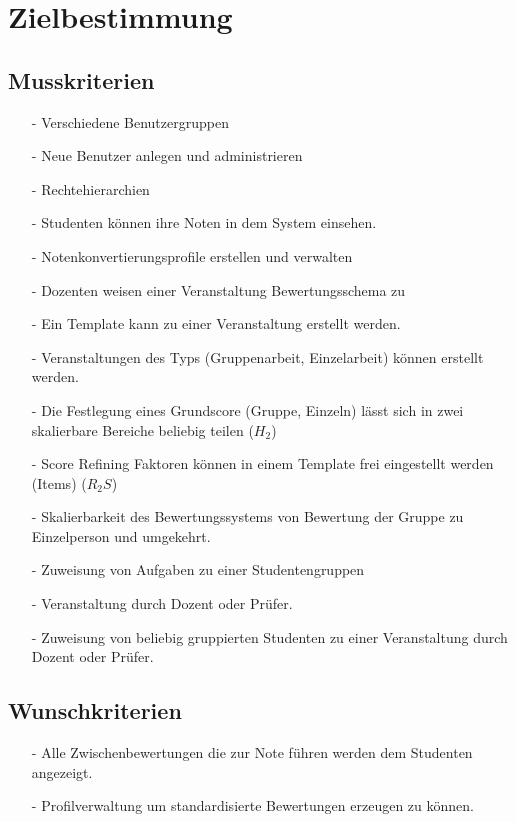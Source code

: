 


	
	\tableofcontents
	\newpage

	\section{Zielbestimmung}
		\subsection{Musskriterien}			

			
			\begin{itemize}
			\item[-]	Verschiedene Benutzergruppen
			\item[-]	Neue Benutzer anlegen und administrieren 
			\item[-]	Rechtehierarchien
			\item[-]	Studenten können ihre Noten in dem System einsehen.
			\item[-]	Notenkonvertierungsprofile erstellen und verwalten
			\item[-]	Dozenten weisen einer Veranstaltung Bewertungsschema zu
			\item[-]	Ein Template kann zu einer Veranstaltung erstellt werden.
			\item[-]	Veranstaltungen des Typs (Gruppenarbeit, Einzelarbeit) können erstellt werden.
			\item[-]	Die Festlegung eines Grundscore (Gruppe, Einzeln) lässt sich in zwei skalierbare \newline Bereiche beliebig teilen ($H_2$)
			\item[-]	Score Refining Faktoren können in einem Template frei eingestellt werden (Items) ($R_2S$)
			\item[-]	Skalierbarkeit des Bewertungssystems von Bewertung der Gruppe zu Einzelperson und umgekehrt.

			\item[-]	Zuweisung von Aufgaben zu einer Studentengruppen
			 \item[-]	Veranstaltung durch Dozent oder Prüfer.				

			\item[-]	Zuweisung von beliebig gruppierten Studenten zu einer Veranstaltung durch Dozent oder Prüfer.				

			\end{itemize}

			
		\subsection{Wunschkriterien}
		\begin{itemize}
		\item[-]	Alle Zwischenbewertungen die zur Note führen werden dem Studenten angezeigt.
		\item[-]	Profilverwaltung um standardisierte Bewertungen erzeugen zu können.
		\end{itemize}
		\clearpage
